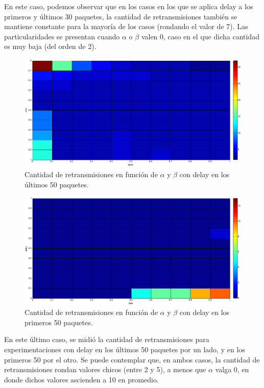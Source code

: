 \documentclass[10pt, a4paper]{article}
\begin{document}
En este caso, podemos observar que en los casos en los que se aplica delay a los primeros y últimos 30 paquetes, la cantidad de retransmisiones también se mantiene constante para la mayoría de los casos (rondando el valor de 7). Las particularidades se presentan cuando $\alpha$ o $\beta$ valen 0, caso en el que dicha cantidad es muy baja (del orden de 2).\\


\begin{figure}[H]
\begin{center}
\includegraphics[width=17cm]{delay-50F-ret-costado.png}
\caption{Cantidad de retransmisiones en función de $\alpha$ y $\beta$ con delay en los últimos 50 paquetes.}
\end{center}
\end{figure}

\begin{figure}[H]
\begin{center}
\includegraphics[width=17cm]{delay-50L-ret-costado.png}
\caption{Cantidad de retransmisiones en función de $\alpha$ y $\beta$ con delay en los primeros 50 paquetes.}
\end{center}
\end{figure}

En este último caso, se midió la cantidad de retransmisiones para experimentaciones con delay en los últimos 50 paquetes por un lado, y en los primeros 50 por el otro. Se puede contemplar que, en ambos casos, la cantidad de retransmisiones rondan valores chicos (entre 2 y 5), a menos que $\alpha$ valga 0, en donde dichos valores ascienden a 10 en promedio. 
\end{document}
